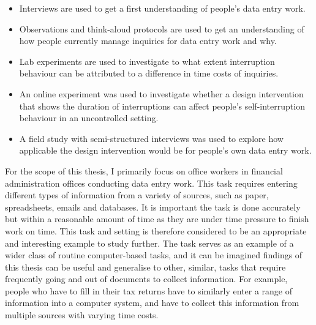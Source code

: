 \begin{itemize}
\item Interviews are used to get a first understanding of people's data entry work.
\item Observations and think-aloud protocols are used to get an understanding of how people currently manage inquiries for data entry work and why. 
\item Lab experiments are used to investigate to what extent interruption behaviour can be attributed to a difference in time costs of inquiries. 
\item An online experiment was used to investigate whether a design intervention that shows the duration of interruptions can affect people's self-interruption behaviour in an uncontrolled setting. 
\item A field study with semi-structured interviews was used to explore how applicable the design intervention would be for people's own data entry work. 
\end{itemize}


For the scope of this thesis, I primarily focus on office workers in financial administration offices conducting data entry work. This task requires entering different types of information from a variety of sources, such as paper, spreadsheets, emails and databases. It is important the task is done accurately but within a reasonable amount of time as they are under time pressure to finish work on time. This task and setting is therefore considered to be an appropriate and interesting example to study further. The task serves as an example of a wider class of routine computer-based tasks, and it can be imagined findings of this thesis can be useful and generalise to other, similar, tasks that require frequently going and out of documents to collect information. For example, people who have to fill in their tax returns have to similarly enter a range of information into a computer system, and have to collect this information from multiple sources with varying time costs.

